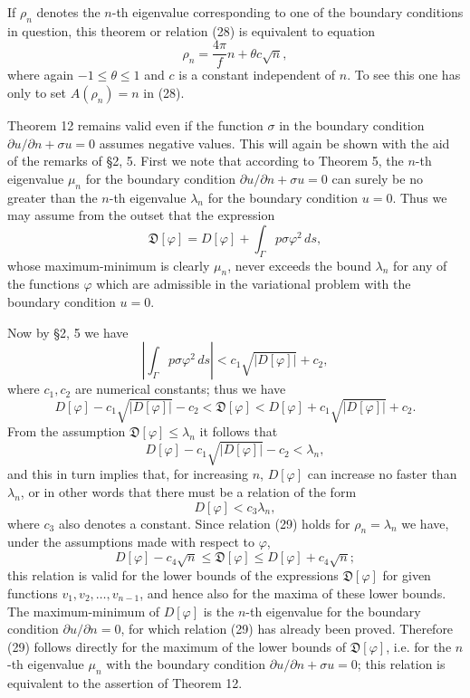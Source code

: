 If $\rho_n$ denotes the $n$-th eigenvalue corresponding to one of the boundary conditions in question, this theorem or relation (28) is equivalent to equation
\begin{equation}\tag{29}
\rho_n=\frac{4\pi}{f}n+\theta c\sqrt n,
\end{equation}
where again $-1\le\theta\le1$ and $c$ is a constant independent of $n$. To see this one has only to set $A(\rho_n)=n$ in (28).

Theorem 12 remains valid even if the function $\sigma$ in the boundary condition $\partial u/\partial n+\sigma u=0$ assumes negative values. This will again be shown with the aid of the remarks of \S2, 5. First we note that according to Theorem 5, the $n$-th eigenvalue $\mu_n$ for the boundary condition $\partial u/\partial n+\sigma u=0$ can surely be no greater than the $n$-th eigenvalue $\lambda_n$ for the boundary condition $u=0$. Thus we may assume from the outset that the expression
\[
\mathfrak D[\varphi]=D[\varphi]+\int_\Gamma p\sigma\varphi^2\,ds,
\]
whose maximum-minimum is clearly $\mu_n$, never exceeds the bound $\lambda_n$ for any of the functions $\varphi$ which are admissible in the variational problem with the boundary condition $u=0$.

Now by \S2, 5 we have
\[
\left|\int_\Gamma p\sigma\varphi^2\,ds\right|<c_1\sqrt{|D[\varphi]|}+c_2,
\]
where $c_1,c_2$ are numerical constants; thus we have
\[
D[\varphi]-c_1\sqrt{|D[\varphi]|}-c_2<\mathfrak D[\varphi]
<D[\varphi]+c_1\sqrt{|D[\varphi]|}+c_2.
\]
From the assumption $\mathfrak D[\varphi]\le\lambda_n$ it follows that
\[
D[\varphi]-c_1\sqrt{|D[\varphi]|}-c_2<\lambda_n,
\]
and this in turn implies that, for increasing $n$, $D[\varphi]$ can increase no faster than $\lambda_n$, or in other words that there must be a relation of the form
\[
D[\varphi]<c_3\lambda_n,
\]
where $c_3$ also denotes a constant. Since relation (29) holds for $\rho_n=\lambda_n$ we have, under the assumptions made with respect to $\varphi$,
\[
D[\varphi]-c_4\sqrt n\le\mathfrak D[\varphi]\le D[\varphi]+c_4\sqrt n;
\]
this relation is valid for the lower bounds of the expressions $\mathfrak D[\varphi]$ for given functions $v_1,v_2,\ldots,v_{n-1}$, and hence also for the maxima of these lower bounds. The maximum-minimum of $D[\varphi]$ is the $n$-th eigenvalue for the boundary condition $\partial u/\partial n=0$, for which relation (29) has already been proved. Therefore (29) follows directly for the maximum of the lower bounds of $\mathfrak D[\varphi]$, i.e. for the $n$-th eigenvalue $\mu_n$ with the boundary condition $\partial u/\partial n+\sigma u=0$; this relation is equivalent to the assertion of Theorem 12.


